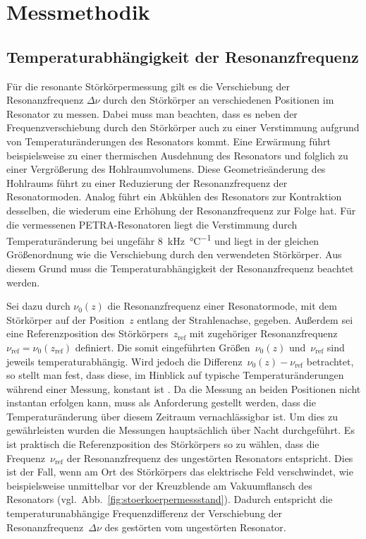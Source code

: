 \section{Messmethodik}

\subsection{Temperaturabhängigkeit der Resonanzfrequenz}
\label{sec:temperaturabh_resonanzfrequenz}
Für die resonante Störkörpermessung gilt es die Verschiebung der Resonanzfrequenz $\Delta \nu$ durch den Störkörper an verschiedenen Positionen im Resonator zu messen.
Dabei muss man beachten, dass es neben der Frequenzverschiebung durch den Störkörper auch zu einer Verstimmung aufgrund von Temperaturänderungen des Resonators kommt.
Eine Erwärmung führt beispielsweise zu einer thermischen Ausdehnung des Resonators und folglich zu einer Vergrößerung des Hohlraumvolumens.
Diese Geometrieänderung des Hohlraums führt zu einer Reduzierung der Resonanzfrequenz der Resonatormoden.
Analog führt ein Abkühlen des Resonators zur Kontraktion desselben, die wiederum eine Erhöhung der Resonanzfrequenz zur Folge hat. Für die vermessenen PETRA-Resonatoren liegt die Verstimmung durch Temperaturänderung bei ungefähr \SI{8}{\kilo\hertz\per\celsius} \cite{desy_petra} und liegt in der gleichen Größenordnung wie die Verschiebung durch den verwendeten Störkörper.
Aus diesem Grund muss die Temperaturabhängigkeit der Resonanzfrequenz beachtet werden.

Sei dazu durch $\nu_0(z)$ die Resonanzfrequenz einer Resonatormode, mit dem Störkörper auf der Position~$z$ entlang der Strahlenachse, gegeben.
Außerdem sei eine Referenzposition des Störkörpers~$z_\mathrm{ref}$ mit zugehöriger Resonanzfrequenz~$\nu_\mathrm{ref} = \nu_0(z_\mathrm{ref})$ definiert.
Die somit eingeführten Größen~$\nu_0(z)$ und~$\nu_\mathrm{ref}$ sind jeweils temperaturabhängig.
Wird jedoch die Differenz~$\nu_0(z) - \nu_\mathrm{ref}$ betrachtet, so stellt man fest, dass diese, im Hinblick auf typische Temperaturänderungen während einer Messung, konstant ist \cite{schedler_pm}.
Da die Messung an beiden Positionen nicht instantan erfolgen kann, muss als Anforderung gestellt werden, dass die Temperaturänderung über diesem Zeitraum vernachlässigbar ist.
Um dies zu gewährleisten wurden die Messungen hauptsächlich über Nacht durchgeführt.
Es ist praktisch die Referenzposition des Störkörpers so zu wählen, dass die Frequenz~$\nu_\mathrm{ref}$ der Resonanzfrequenz des ungestörten Resonators entspricht.
Dies ist der Fall, wenn am Ort des Störkörpers das elektrische Feld verschwindet, wie beispielsweise unmittelbar vor der Kreuzblende am Vakuumflansch des Resonators (vgl.\ Abb.\ \ref{fig:stoerkoerpermessstand}).
Dadurch entspricht die temperaturunabhängige Frequenzdifferenz der Verschiebung der Resonanzfrequenz~$\Delta \nu$ des gestörten vom ungestörten Resonator.


